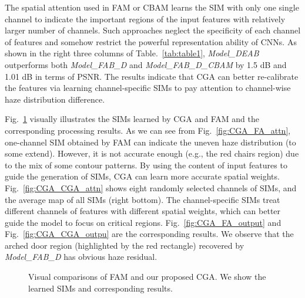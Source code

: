 \documentclass[lettersize,journal]{IEEEtran}
\begin{document}
The spatial attention used in FAM or CBAM learns the SIM with only one single channel to indicate the important regions of the input features with relatively larger number of channels.
Such approaches neglect the specificity of each channel of features and somehow restrict the powerful representation ability of CNNs.
As shown in the right three columns of Table.~\ref{tab:table1}, \textit{Model\_DEAB} outperforms both \textit{Model\_FAB\_D} and \textit{Model\_FAB\_D\_CBAM} by 1.5 dB and 1.01 dB in terms of PSNR.
The results indicate that CGA can better re-calibrate the features via learning channel-specific SIMs to pay attention to channel-wise haze distribution difference.



Fig.~\ref{fig:CGA_attn} visually illustrates the SIMs learned by CGA and FAM and the corresponding processing results.
As we can see from Fig.~\ref{fig:CGA_FA_attn}, one-channel SIM obtained by FAM can indicate the uneven haze distribution (to some extend).
However, it is not accurate enough (e.g., the red chairs region) due to the mix of some contour patterns.
By using the content of input features to guide the generation of SIMs, CGA can learn more accurate spatial weights.
Fig.~\ref{fig:CGA_CGA_attn} shows eight randomly selected channels of SIMs, and the average map of all SIMs (right bottom).
The channel-specific SIMs treat different channels of features with different spatial weights, which can better guide the model to focus on critical regions.
Fig.~\ref{fig:CGA_FA_output} and Fig.~\ref{fig:CGA_CGA_outpu} are the corresponding results.
We observe that the arched door region (highlighted by the red rectangle) recovered by \textit{Model\_FAB\_D} has obvious haze residual.


\begin{figure}[h]
	\centering
	\hfil
	\vspace{-3mm}
	\hfil
	\vspace{-3mm}
	\hfil
	\caption{Visual comparisons of FAM and our proposed CGA. We show the learned SIMs and corresponding results.}
	\label{fig:CGA_attn}
\end{figure}
\end{document}
